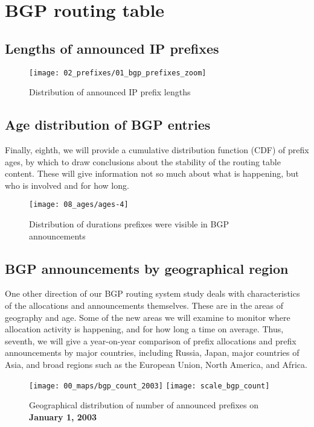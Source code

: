 \section{BGP routing table}
\label{sec:bgp}


\subsection{Lengths of announced IP prefixes}

\begin{figure}[htbp]
	\centering
		\texttt{[image: 02\_prefixes/01\_bgp\_prefixes\_zoom]}
	\caption{Distribution of announced IP prefix lengths}
	\label{fig:bgp prefix distribution}
\end{figure}

\subsection{Age distribution of BGP entries}
Finally, eighth, we will provide a cumulative distribution function (CDF) of prefix ages, by which to draw conclusions about the stability of the routing table content. These will give information not so much about what is happening, but who is involved and for how long.
	
\begin{figure}[htbp]
	\centering
		\texttt{[image: 08\_ages/ages-4]}
	\caption{Distribution of durations prefixes were visible in BGP announcements}
	\label{fig:bgp ages}
\end{figure}
	
\subsection{BGP announcements by geographical region}
One other direction of our BGP routing system study deals with characteristics of the allocations and announcements themselves.  These are in the areas of geography and age.  Some of the new areas we will examine to monitor where allocation activity is happening, and for how long a time on average.  Thus, seventh, we will give a year-on-year comparison of prefix allocations and prefix announcements by major countries, including Russia, Japan, major countries of Asia, and broad regions such as the European Union, North America, and Africa.

\begin{figure}[p]
	\centering
		\texttt{[image: 00\_maps/bgp\_count\_2003]}%
		\hspace{-0.98\columnwidth}%
		\texttt{[image: scale\_bgp\_count]}\hspace{-1cm}%
		\hspace{0.98\columnwidth}
	\caption{Geographical distribution of number of announced prefixes on \textbf{January 1, 2003}}
	\label{fig:bgp prefixes 2003}
\end{figure}

